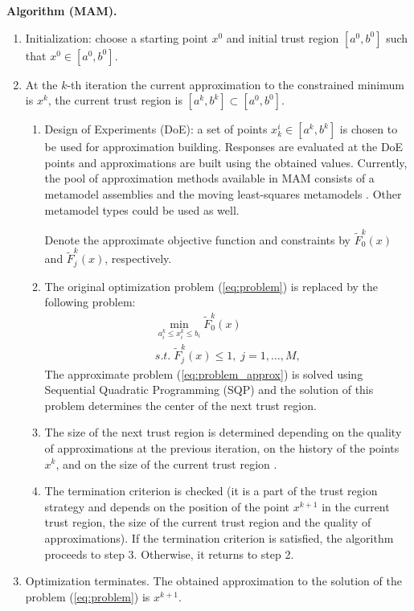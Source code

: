 \documentclass[runningheads,a4paper]{llncs}
\begin{document}
\textbf{Algorithm (MAM).}
\begin{enumerate}
\item Initialization: choose a starting point $ x^0$ and initial trust region $[ a^0,  b^0]$ such that $ x^0 \in [ a^0,  b^0]$.
\item At the $k$-th iteration the current approximation to the constrained minimum is $ x^k$, the current trust region is $[ a^k,  b^k] \subset [ a^0,  b^0]$.
  \begin{enumerate}[label=(\alph*)]
    \item Design of Experiments (DoE): a set of points $ x_k^i \in [ a^k,  b^k]$ is chosen to be used for approximation building. Responses are evaluated at the DoE points and approximations are built using the obtained values. Currently, the pool of approximation methods available in MAM consists of a metamodel assemblies \cite{PolynkinToropov2012} and the moving least-squares metamodels \cite{LancasterSalkauskas1981,Liszka1984,ChoiYounYang2001,ToropovSchrammSahaiJones2005}. Other metamodel types could be used as well.

    Denote the approximate objective function and constraints by $\widetilde{F}^k_0(x)$ and $\widetilde{F}^k_j(x)$, respectively.
    \item The original optimization problem (\ref{eq:problem}) is replaced by the following problem:
    \begin{equation}
      \label{eq:problem_approx}
      \begin{array}{c}
      \min\limits_{a_i^k \le x_i ^k\le b_i}\widetilde{F}^k_0(x) \\
      s.t.\; \widetilde{F}^k_j( x) \le 1,\; j=1,\dots ,M,
      \end{array}
    \end{equation}
    The approximate problem (\ref{eq:problem_approx}) is solved using Sequential Quadratic Programming (SQP) and the solution of this problem determines the center of the next trust region.
    \item The size of the next trust region is determined depending on the quality of approximations at the previous iteration, on the history of the points $ x^k$, and on the size of the current trust region \cite{KeulenToropovMarkine1996}.
    \item The termination criterion is checked (it is a part of the trust region strategy and depends on the position of the point $ x^{k+1}$ in the current trust region, the size of the current trust region and the quality of approximations). If the termination criterion is satisfied, the algorithm proceeds to step 3. Otherwise, it returns to step 2.
  \end{enumerate}
  \item Optimization terminates. The obtained approximation to the solution of the problem (\ref{eq:problem}) is $ x^{k+1}$.
\end{enumerate}
\end{document}
